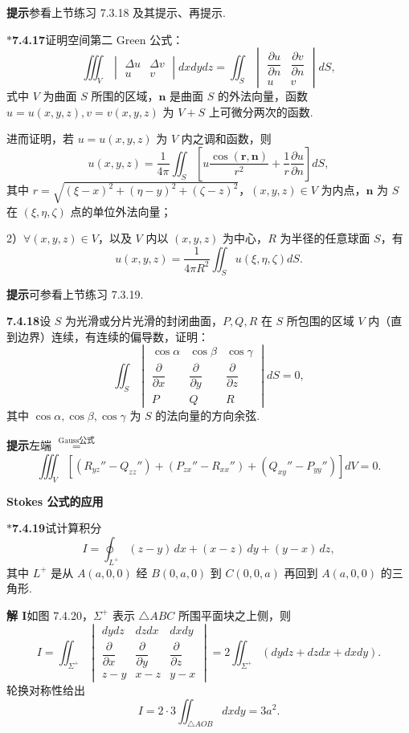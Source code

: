 \documentclass[UTF8,12pt,a4paper,fontset=fandol]{ctexart}
\providecommand{\xlongequal}[1]{\overset{#1}{=}}
\begin{document}
\noindent\textbf{提示}\quad 参看上节练习 7.3.18 及其提示、再提示.

\noindent\textbf{$*$7.4.17}\quad 证明空间第二 Green 公式：
\[
\iiint_V
\begin{vmatrix}
\Delta u & \Delta v\\
u & v
\end{vmatrix}dxdydz
=\iint_S
\begin{vmatrix}
\dfrac{\partial u}{\partial n} & \dfrac{\partial v}{\partial n}\\
u & v
\end{vmatrix}dS,
\]
式中 $V$ 为曲面 $S$ 所围的区域，$\mathbf n$ 是曲面 $S$ 的外法向量，函数 $u=u(x,y,z),v=v(x,y,z)$ 为 $V+S$ 上可微分两次的函数.

进而证明，若 $u=u(x,y,z)$ 为 $V$ 内之调和函数，则
\[
u(x,y,z)=\frac1{4\pi}\iint_S\left[u\frac{\cos(\mathbf r,\mathbf n)}{r^2}+\frac1r\frac{\partial u}{\partial n}\right]dS,
\]
其中 $r=\sqrt{(\xi-x)^2+(\eta-y)^2+(\zeta-z)^2}$，$(x,y,z)\in V$ 为内点，$\mathbf n$ 为 $S$ 在 $(\xi,\eta,\zeta)$ 点的单位外法向量；

2）$\forall(x,y,z)\in V$，以及 $V$ 内以 $(x,y,z)$ 为中心，$R$ 为半径的任意球面 $S$，有
\[
u(x,y,z)=\frac1{4\pi R^2}\iint_Su(\xi,\eta,\zeta)dS.
\]

\noindent\textbf{提示}\quad 可参看上节练习 7.3.19.

\noindent\textbf{7.4.18}\quad 设 $S$ 为光滑或分片光滑的封闭曲面，$P,Q,R$ 在 $S$ 所包围的区域 $V$ 内（直到边界）连续，有连续的偏导数，证明：
\[
\iint_S
\begin{vmatrix}
\cos\alpha & \cos\beta & \cos\gamma\\
\dfrac{\partial}{\partial x} & \dfrac{\partial}{\partial y} & \dfrac{\partial}{\partial z}\\
P & Q & R
\end{vmatrix}dS=0,
\]
其中 $\cos\alpha,\cos\beta,\cos\gamma$ 为 $S$ 的法向量的方向余弦.

\noindent\textbf{提示}\quad 左端 $\xlongequal{\text{Gauss公式}}$
\[
\iiint_V\left[(R_{yz}''-Q_{zz}'')+(P_{zx}''-R_{xx}'')+(Q_{xy}''-P_{yy}'')\right]dV=0.
\]

\noindent\textbf{Stokes 公式的应用}

\noindent\textbf{$*$7.4.19}\quad 试计算积分
\[
I=\oint_{L^+}(z-y)\,dx+(x-z)\,dy+(y-x)\,dz,
\]
其中 $L^+$ 是从 $A(a,0,0)$ 经 $B(0,a,0)$ 到 $C(0,0,a)$ 再回到 $A(a,0,0)$ 的三角形.

\noindent\textbf{解 I}\quad 如图 7.4.20，$\Sigma^+$ 表示 $\triangle ABC$ 所围平面块之上侧，则
\[
I=\iint_{\Sigma^+}
\begin{vmatrix}
dydz & dzdx & dxdy\\
\dfrac{\partial}{\partial x} & \dfrac{\partial}{\partial y} & \dfrac{\partial}{\partial z}\\
z-y & x-z & y-x
\end{vmatrix}
=2\iint_{\Sigma^+}(dydz+dzdx+dxdy).
\]
轮换对称性给出
\[
I=2\cdot3\iint_{\triangle AOB}dxdy=3a^2.
\]
\end{document}
